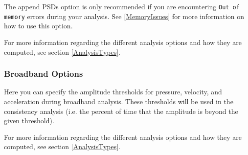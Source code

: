 \documentclass[11pt]{report}
\begin{document}
The append PSDs option is only recommended if you are encountering \texttt{Out of memory} errors during your analysis.  See \ref{MemoryIssues} for more information on how to use this option.

For more information regarding the different analysis options and how they are computed, see section \ref{AnalysisTypes}.

\subsubsection{Broadband Options}
Here you can specify the amplitude thresholds for pressure, velocity, and acceleration during broadband analysis.  These thresholds will be used in the consistency analysis (i.e. the percent of time that the amplitude is beyond the given threshold).

For more information regarding the different analysis options and how they are computed, see section \ref{AnalysisTypes}.
\end{document}
